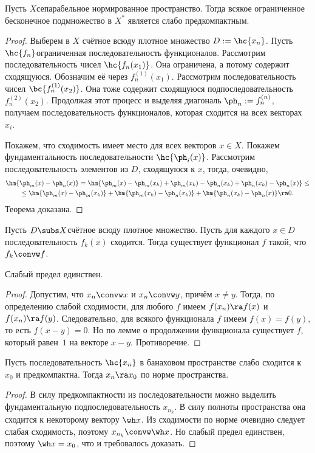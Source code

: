 \documentclass[a4paper]{article}
\newcommand{\n}[1]{^{(#1)}}
\begin{document}
\begin{theorem}
Пусть $X$\т сепарабельное нормированное пространство. Тогда всякое ограниченное
бесконечное подмножество в $X^*$ является слабо предкомпактным.
\end{theorem}
\begin{proof}
Выберем в $X$ счётное всюду плотное множество $D := \hc{x_n}$. Пусть $\hc{f_n}$\т ограниченная
последовательность функционалов. Рассмотрим последовательность чисел $\hc{f_n(x_1)}$. Она ограничена,
а потому содержит сходящуюся. Обозначим её через $f_n\n1(x_1)$. Рассмотрим последовательность чисел
$\bc{f_n\n1(x_2)}$. Она тоже содержит сходящуюся подпоследовательность $f_n\n2(x_2)$.
Продолжая этот процесс и выделяя диагональ $\ph_n := f_n\n n$, получаем последовательность функционалов,
которая сходится на всех векторах $x_i$.

Покажем, что сходимость имеет место для всех векторов $x \in X$. Покажем фундаментальность
последовательности $\hc{\ph_i(x)}$.
Рассмотрим последовательность элементов из $D$, сходящуюся к $x$, тогда, очевидно,
\begin{multline*}
\hm{\ph_m(x) - \ph_n(x)} = \hm{\ph_m(x) - \ph_m(x_k) + \ph_m(x_k) - \ph_n(x_k) + \ph_n(x_k) - \ph_n(x)} \le\\\le
\hm{\ph_m(x) - \ph_m(x_k)} + \hm{\ph_m(x_k) - \ph_n(x_k)} + \hm{\ph_n(x_k) - \ph_n(x)} \ra 0.
\end{multline*}
Теорема доказана.
\end{proof}

\begin{imp}
Пусть $D \subs X$\т счётное всюду плотное множество.
Пусть для каждого $x \in D$ последовательность $f_k(x)$ сходится. Тогда существует
функционал $f$ такой, что $f_k \convw f$.
\end{imp}

\begin{stm}
Слабый предел единствен.
\end{stm}
\begin{proof}
Допустим, что $x_n \convw x$ и $x_n \convw y$, причём $x \neq y$. Тогда, по определению
слабой сходимости, для любого $f$ имеем $f(x_n) \ra f(x)$ и $f(x_n) \ra f(y)$. Следовательно,
для всякого функционала $f$ имеем $f(x) = f(y)$, то есть $f(x-y) = 0$.
Но по лемме о продолжении функционала существует $f$, который равен~$1$ на  векторе $x-y$.
Противоречие.
\end{proof}

\begin{lemma}
Пусть последовательность $\hc{x_n}$ в банаховом пространстве
слабо сходится к $x_0$ и предкомпактна. Тогда $x_n \ra x_0$ по норме пространства.
\end{lemma}
\begin{proof}
В силу предкомпактности из последовательности можно выделить фундаментальную подпоследовательность $x_{n_k}$.
В силу полноты пространства она сходится к некоторому вектору $\wh x$. Из сходимости
по норме очевидно следует слабая сходимость, поэтому $x_{n_k} \convw \wh x$.
Но слабый предел единствен, поэтому $\wh x = x_0$, что и требовалось доказать.
\end{proof}
\end{document}

